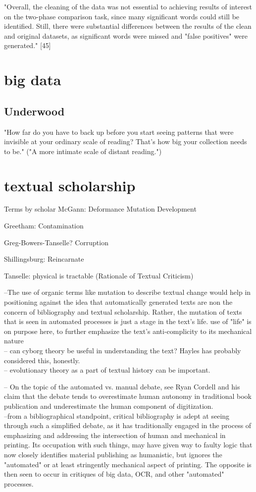 \documentclass[course, english]{Notes}
\begin{document}
 "Overall, the cleaning of the data was not essential to achieving results of interest on the two-phase comparison task, since many significant words could still be identified. Still, there were substantial differences between the results of the clean and original datasets, as significant words were missed and "false positives" were generated." [45]


\section{big data}

\subsection{Underwood}
 "How far do you have to back up before you start seeing patterns that were invisible at your ordinary scale of reading? That’s how big your collection needs to be." 
("A more intimate scale of distant reading.")
	
	
	
	
	
	
\section{textual scholarship}
Terms by scholar
McGann:
	Deformance
	Mutation
	Development
	
Greetham:
	Contamination
	
Greg-Bowers-Tanselle?
	Corruption

Shillingsburg: 
	Reincarnate

Tanselle: 
	physical is tractable (Rationale of Textual Criticism)

--{The use of organic terms like mutation to describe textual change would help in positioning against the idea that automatically generated texts are non the concern of bibliography and textual scholarship. Rather, the mutation of texts that is seen in automated processes is just a stage in the text's life.}
		 {use of "life" is on purpose here, to further emphasize the text's anti-complicity to its mechanical nature}
		\\-- {can cyborg theory be useful in understanding the text? Hayles has probably considered this, honestly.}
		\\-- {evolutionary theory as a part of textual history can be important.}
		
-- On the topic of the automated vs. manual debate, see Ryan Cordell and his claim that the debate tends to overestimate human autonomy in traditional book publication and underestimate the human component of digitization. 
\\--from a bibliographical standpoint, critical bibliography is adept at seeing through such a simplified debate, as it has traditionally engaged in the process of emphasizing and addressing the intersection of human and mechanical in printing. Its occupation with such things, may have given way to faulty logic that now closely identifies material publishing as humanistic, but ignores the "automated" or at least stringently mechanical aspect of printing. The opposite is then seen to occur in critiques of big data, OCR, and other "automated" processes. 
		
\end{document}
